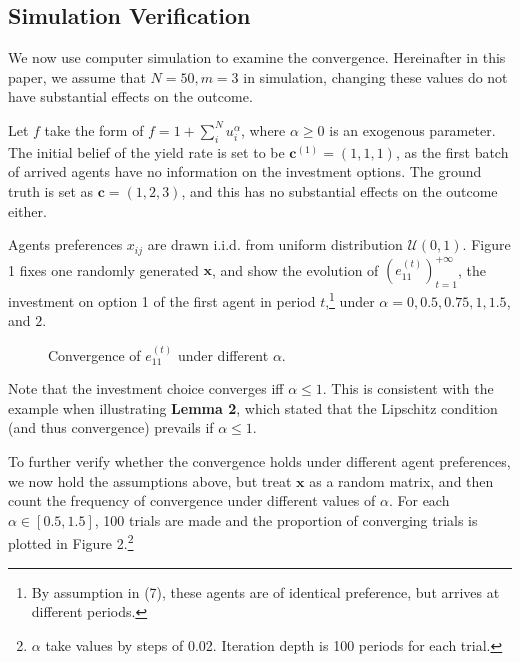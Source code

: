 \documentclass[12pt,english]{article}
\theoremstyle{plain}
\theoremstyle{plain}
\begin{document}
	
	\subsection{Simulation Verification}
	We now use computer simulation to examine the convergence. Hereinafter in this paper, we assume that $N = 50, m = 3$ in simulation, changing these values do not have substantial effects on the outcome.\par
	Let $f$ take the form of $f = 1 + \sum_{i}^{N}u_i^\alpha$, where $\alpha \geqslant 0$ is an exogenous parameter. The initial belief of the yield rate is set to be $\mathbf{c}^{(1)} = (1, 1, 1)$, as the first batch of arrived agents have no information on the investment options. The ground truth is set as $\mathbf{c} = (1, 2, 3)$, and this has no substantial effects on the outcome either.\par 
	
	Agents preferences $x_{ij}$ are drawn i.i.d. from uniform distribution $\mathcal{U}(0, 1)$. Figure 1 fixes one randomly generated $\mathbf{x}$, and show the evolution of $\left(e_{11}^{(t)}\right)_{t = 1}^{+\infty}$, the investment on option 1 of the first agent in period $t$,\footnote{By assumption in (7), these agents are of identical preference, but arrives at different periods.} under $\alpha = 0, 0.5, 0.75, 1, 1.5$, and $2$.
	
	
	\begin{figure}[h]
		\centering
		
		\caption{Convergence of $e_{11}^{(t)}$ under different $\alpha$.}
		\label{fig:conv_1}
	\end{figure}
	
	Note that the investment choice converges iff $\alpha \leqslant 1$. This is consistent with the example when illustrating \textbf{Lemma 2}, which stated that the Lipschitz condition (and thus convergence) prevails if $\alpha \leqslant 1$.\par 
	
	To further verify whether the convergence holds under different agent preferences, we now hold the assumptions above, but treat $\mathbf{x}$ as a random matrix, and then count the frequency of convergence under different values of $\alpha$. For each $\alpha \in [0.5, 1.5]$, 100 trials are made and the proportion of converging trials is plotted in Figure 2.\footnote{$\alpha$ take values by steps of 0.02. Iteration depth is 100 periods for each trial.}
	
\end{document}
